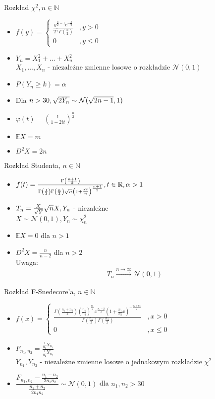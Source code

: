 \documentclass[a4paper,12pt]{report}
\theoremstyle{break}
\theoremstyle{definition}
\theoremstyle{defi}
\theoremstyle{break}
\theoremstyle{defi}
\begin{document}
{\Large Rozkład $ \chi^2 ,n\in \mathbb N $}
\begin{multicols}{2}
\begin{itemize}
\item $ f(y)=
\left \{
\begin{array}{ll}
\frac{y^{\frac{n}{2}-1}e^{-\frac{y}{2}}}{2^{\frac{n}{2}}\Gamma\left(\frac{n}{2}\right)}&,y>0\\
0&,y\le0
\end{array}
\right . $
\item $ Y_n=X_1^2+\dots+X_n^2 $\\
$ X_1,\dots,X_n$ - niezależne zmienne losowe o rozkładzie $ \mathcal N(0,1) $ 
\item $ P(Y_n\ge k)=\alpha $
\item Dla $ n>30,\\
 \sqrt{2Y_n}\sim\mathcal N(\sqrt{2n-1},1) $
 \item $ \varphi(t)=\left(\frac{1}{1-2it}\right)^{\frac{n}{2}} $
 \item $ \mathbb E X=m $
 \item $ D^2X=2n $
\end{itemize}
\end{multicols}
{\Large Rozkład Studenta, $ n\in \mathbb N  $}
\begin{multicols}{2}
\begin{itemize}
\item $ f(t)=
\frac{\Gamma\left(\frac{n+1}{2}\right)}{\Gamma\left(\frac{1}{2}\right)\Gamma\left(\frac{n}{2}\right)\sqrt n\left(1+\frac{t^2}{n}\right)^{\frac{n+1}{2}}},\\
t\in \mathbb R ,\alpha>1 $
\item $ T_n=\frac{X}{\sqrt Y}\sqrt n\\
X,Y_n $ - niezależne\\
$ X\sim\mathcal N(0,1),Y_n\sim \chi^2_n $
\item $ \mathbb E X=0 $ dla $ n>1 $
\item $ D^2X=\frac{n}{n-2} $ dla $ n>2 $\\
Uwaga:
\begin{gather*}
T_n\xrightarrow{n\to\infty }\mathcal N(0,1)
\end{gather*}
\end{itemize}
\end{multicols}
{\Large Rozkład F-Snedecore'a, $ n\in \mathbb N  $}
\begin{itemize}
\item $ f(x)=
\left \{
\begin{array}{ll}
\frac{\Gamma\left(\frac{n_1+n_2}{2}\right)\left(\frac{n_1}{n_2}\right)^{\frac{n_1}{2}}x^{\frac{n_1-2}{2}}\left(1+\frac{n_1}{n_2}x\right)^{-\frac{n_1+n_2}{2}}}{\Gamma\left(\frac{n_1}{2}\right)\Gamma\left(\frac{n_2}{2}\right)}&,x>0\\
0&,x\le0
\end{array}
\right . $
\item $ F_{n_1,n_2}=\frac{\frac{1}{n_1}Y_{n_1}}{\frac{1}{n_2}Y_{n_2}} $\\
$ Y_{n_1},Y_{n_2} $ - niezależne zmienne losowe o jednakowym rozkładzie $ \chi^2 $
\item $ \dfrac{F_{n_1,n_2}-\frac{n_1-n_2}{2n_1n_2}}{\frac{n_1+n_2}{2n_1n_2}}\sim\mathcal N(0,1) $ dla $ n_1,n_2>30 $
\end{itemize}
\end{document}
